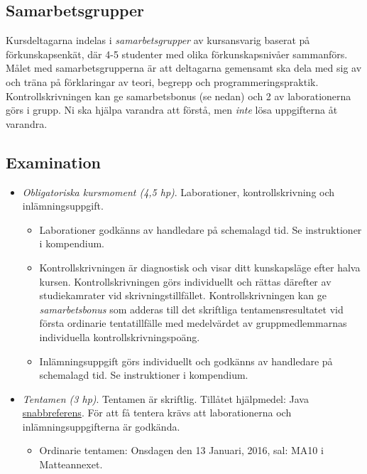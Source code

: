 \subsection{Samarbetsgrupper}\label{samarbetsgrupper}

Kursdeltagarna indelas i \emph{samarbetsgrupper} av kursansvarig baserat
på förkunskapsenkät, där 4-5 studenter med olika förkunskapsnivåer
sammanförs. Målet med samarbetsgrupperna är att deltagarna gemensamt ska
dela med sig av och träna på förklaringar av teori, begrepp och
programmeringspraktik. Kontrollskrivningen kan ge samarbetsbonus (se
nedan) och 2 av laborationerna görs i grupp. Ni ska hjälpa varandra att
förstå, men \emph{inte} lösa uppgifterna åt varandra.

\subsection{Examination}\label{examination}

\begin{itemize}
\item
  \emph{Obligatoriska kursmoment (4,5 hp)}. Laborationer,
  kontrollskrivning och inlämningsuppgift.

  \begin{itemize}
  \item
    Laborationer godkänns av handledare på schemalagd tid. Se
    instruktioner i kompendium.
  \item
    Kontrollskrivningen är diagnostisk och visar ditt kunskapsläge efter
    halva kursen. Kontrollskrivningen görs individuellt och rättas
    därefter av studiekamrater vid skrivningstillfället.
    Kontrollskrivningen kan ge \emph{samarbetsbonus} som adderas till
    det skriftliga tentamensresultatet vid första ordinarie
    tentatillfälle med medelvärdet av gruppmedlemmarnas individuella
    kontrollskrivningspoäng.
  \item
    Inlämningsuppgift görs individuellt och godkänns av handledare på
    schemalagd tid. Se instruktioner i kompendium.
  \end{itemize}
\item
  \emph{Tentamen (3 hp)}. Tentamen är skriftlig. Tillåtet hjälpmedel:
  Java \href{http://cs.lth.se/eda016/javaref}{snabbreferens}. För att få
  tentera krävs att laborationerna och inlämningsuppgifterna är
  godkända.

  \begin{itemize}
  \tightlist
  \item
    Ordinarie tentamen: Onsdagen den 13 Januari, 2016, sal: MA10 i
    Matteannexet.
  \end{itemize}
\end{itemize}
